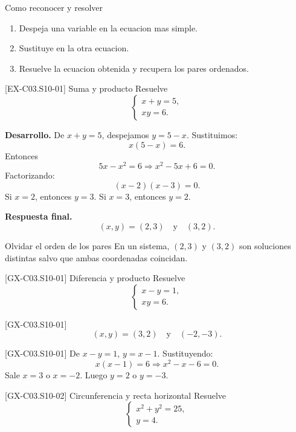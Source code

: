 \begin{methodbox}{Como reconocer y resolver}
\begin{enumerate}
  \item Despeja una variable en la ecuacion mas simple.
  \item Sustituye en la otra ecuacion.
  \item Resuelve la ecuacion obtenida y recupera los pares ordenados.
\end{enumerate}
\end{methodbox}

\begin{solvedexample}{[EX-C03.S10-01] Suma y producto}
Resuelve
\[
\begin{cases}
x+y=5,\\
xy=6.
\end{cases}
\]

\textbf{Desarrollo.} De \(x+y=5\), despejamos \(y=5-x\). Sustituimos:
\[
x(5-x)=6.
\]
Entonces
\[
5x-x^2=6 \Longrightarrow x^2-5x+6=0.
\]
Factorizando:
\[
(x-2)(x-3)=0.
\]
Si \(x=2\), entonces \(y=3\). Si \(x=3\), entonces \(y=2\).

\textbf{Respuesta final.}
\[
(x,y)=(2,3)\quad \text{y}\quad (3,2).
\]
\end{solvedexample}

\begin{commonerror}{Olvidar el orden de los pares}
En un sistema, \((2,3)\) y \((3,2)\) son soluciones distintas salvo que ambas coordenadas
coincidan.
\end{commonerror}

\begin{guidedexercise}{[GX-C03.S10-01] Diferencia y producto}
Resuelve
\[
\begin{cases}
x-y=1,\\
xy=6.
\end{cases}
\]
\end{guidedexercise}

\begin{shortanswer}{[GX-C03.S10-01]}
\[
(x,y)=(3,2)\quad \text{y}\quad (-2,-3).
\]
\end{shortanswer}

\begin{fullsolution}{[GX-C03.S10-01]}
De \(x-y=1\), \(y=x-1\). Sustituyendo:
\[
x(x-1)=6 \Longrightarrow x^2-x-6=0.
\]
Sale \(x=3\) o \(x=-2\). Luego \(y=2\) o \(y=-3\).
\end{fullsolution}

\begin{guidedexercise}{[GX-C03.S10-02] Circunferencia y recta horizontal}
Resuelve
\[
\begin{cases}
x^2+y^2=25,\\
y=4.
\end{cases}
\]
\end{guidedexercise}

